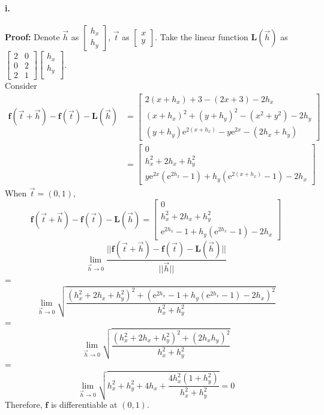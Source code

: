 \documentclass[11pt, a4paper]{article}
\begin{document}
\paragraph{i.}
\textbf{Proof:} Denote $\vec{h}$ as $\begin{bmatrix}
    h_x \\
    h_y
\end{bmatrix}$, $\vec{t}$ as
$\begin{bmatrix}
    x \\
    y
\end{bmatrix}$. 
Take the linear function $\bm{L}(\vec{h})$ as $\begin{bmatrix}
    2 & 0 \\
    0 & 2 \\
    2 & 1
\end{bmatrix}
\begin{bmatrix}
    h_x \\
    h_y \\
\end{bmatrix}$. \\ 
Consider
$$\begin{aligned}
    \bm{f}(\vec{t} + \vec{h}) - \bm{f}(\vec{t}) - \bm{L}(\vec{h}) &=
    \begin{bmatrix}
       2(x + h_x) + 3 - (2x + 3) - 2h_x \\
       (x + h_x) ^ 2 + (y + h_y) ^ 2 - (x ^ 2 + y ^ 2) - 2h_y \\
       (y + h_y)\mathrm{e} ^ {2(x + h_x)} - y\mathrm{e} ^ {2x} - (2h_x + h_y)
    \end{bmatrix} \\
    &=
    \begin{bmatrix}
        0 \\
        h_x ^ 2 + 2h_x + h_y ^ 2 \\
        y\mathrm{e} ^ {2x} (\mathrm{e} ^ {2h_x} - 1) + h_y(\mathrm{e} ^ {2(x + h_x)} - 1) - 2h_x
    \end{bmatrix}
\end{aligned}$$
When $\vec{t} = (0, 1)$,
$$\bm{f}(\vec{t} + \vec{h}) - \bm{f}(\vec{t}) - \bm{L}(\vec{h}) = 
\begin{bmatrix}
    0 \\
    h_x ^ 2 + 2h_x + h_y ^ 2 \\
    \mathrm{e} ^ {2h_x} - 1 + h_y(\mathrm{e} ^ {2h_x} - 1) - 2h_x
\end{bmatrix}$$
$$\lim_{\vec{h} \to 0} \frac{||\bm{f}(\vec{t} + \vec{h}) - \bm{f}(\vec{t}) - \bm{L}(\vec{h})||}{|| \vec{h} ||}$$
=
$$\lim_{\vec{h} \to 0} \sqrt{\frac{(h_x ^ 2 + 2h_x + h_y ^ 2) ^ 2 + (\mathrm{e} ^ {2h_x} - 1 + h_y(\mathrm{e} ^ {2h_x} - 1) - 2h_x) ^ 2}{h_x ^ 2 + h_y ^ 2}}$$
=
$$\lim_{\vec{h} \to 0} \sqrt{\frac{(h_x ^ 2 + 2h_x + h_y ^ 2) ^ 2 + (2h_x h_y) ^ 2}{h_x ^ 2 + h_y ^ 2}}$$
=
$$\lim_{\vec{h} \to 0} \sqrt{h_x ^ 2 + h_y ^ 2 + 4h_x + \frac{4h_x ^ 2(1 + h_y ^ 2)}{h_x ^ 2 + h_y ^ 2}} = 0$$
Therefore, $\bm{f}$ is differentiable at $(0, 1)$.
\end{document}
